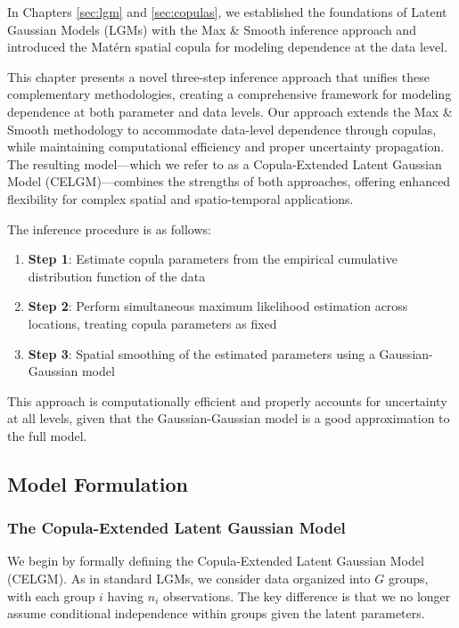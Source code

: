 
In Chapters \ref{sec:lgm} and \ref{sec:copulas}, we established the foundations of Latent Gaussian Models (LGMs) with the Max \& Smooth inference approach and introduced the Matérn spatial copula for modeling dependence at the data level.

This chapter presents a novel three-step inference approach that unifies these complementary methodologies, creating a comprehensive framework for modeling dependence at both parameter and data levels. Our approach extends the Max \& Smooth methodology to accommodate data-level dependence through copulas, while maintaining computational efficiency and proper uncertainty propagation. The resulting model---which we refer to as a Copula-Extended Latent Gaussian Model (CELGM)---combines the strengths of both approaches, offering enhanced flexibility for complex spatial and spatio-temporal applications.

The inference procedure is as follows:
\begin{enumerate}
    \item \textbf{Step 1}: Estimate copula parameters from the empirical cumulative distribution function of the data
    \item \textbf{Step 2}: Perform simultaneous maximum likelihood estimation across locations, treating copula parameters as fixed
    \item \textbf{Step 3}: Spatial smoothing of the estimated parameters using a Gaussian-Gaussian model
\end{enumerate}

This approach is computationally efficient and properly accounts for uncertainty at all levels, given that the Gaussian-Gaussian model is a good approximation to the full model.

\subsection{Model Formulation}

\subsubsection{The Copula-Extended Latent Gaussian Model}
We begin by formally defining the Copula-Extended Latent Gaussian Model (CELGM). As in standard LGMs, we consider data organized into $G$ groups, with each group $i$ having $n_i$ observations. The key difference is that we no longer assume conditional independence within groups given the latent parameters.

